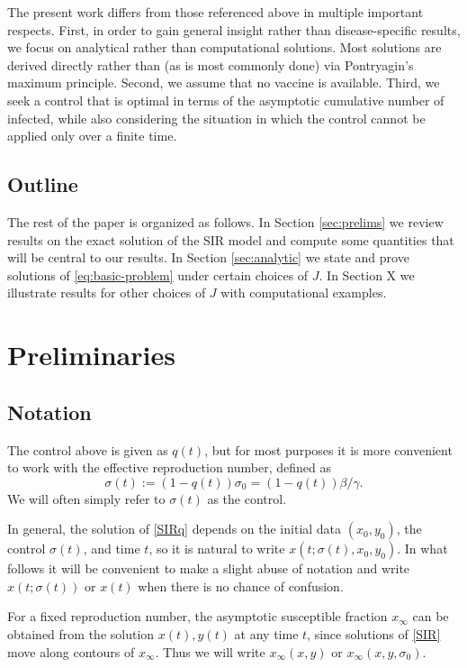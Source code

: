 \documentclass[english,12pt]{article}
\newcommand{\Rnot}{\sigma_0}
\newcommand{\Sinf}{x_\infty}
\begin{document}
The present work differs from those referenced above in multiple important
respects.  First, in order to gain general insight rather than disease-specific
results, we focus on analytical rather than computational solutions.  Most solutions
are derived directly rather than (as is most commonly done) via Pontryagin's maximum principle.
Second, we assume that no vaccine is available.  Third, we seek a control that is optimal
in terms of the asymptotic cumulative number of infected, while also considering the
situation in which the control cannot be applied only over a finite time.

\subsection{Outline}
The rest of the paper is organized as follows.  In Section \ref{sec:prelims} we
review results on the exact solution of the SIR model and compute some quantities
that will be central to our results.  In Section \ref{sec:analytic} we state
and prove solutions of \eqref{eq:basic-problem} under certain choices of $J$.
In Section X we illustrate results for other choices of $J$ with computational
examples.

\section{Preliminaries\label{sec:prelims}}

\subsection{Notation}
The control above is given as $q(t)$, but for most purposes it is more
convenient to work with the effective reproduction number, defined as
$$
    \sigma(t) := (1-q(t))\Rnot = (1-q(t))\beta/\gamma.
$$
We will often simply refer to $\sigma(t)$ as the control.

In general, the solution of \eqref{SIRq} depends on the initial data
$(x_0,y_0)$, the control $\sigma(t)$, and time $t$, so it is natural to write
$x(t;\sigma(t),x_0,y_0)$.
In what follows it will be convenient to make a slight abuse of notation and
write $x(t;\sigma(t))$ or $x(t)$ when there is no chance of confusion.

For a fixed reproduction number, the asymptotic susceptible fraction $\Sinf$
can be obtained from the solution $x(t), y(t)$ at any time $t$, since solutions
of \eqref{SIR} move along contours of $\Sinf$.  Thus we will write $\Sinf(x,y)$
or $\Sinf(x,y,\Rnot)$.
\end{document}
